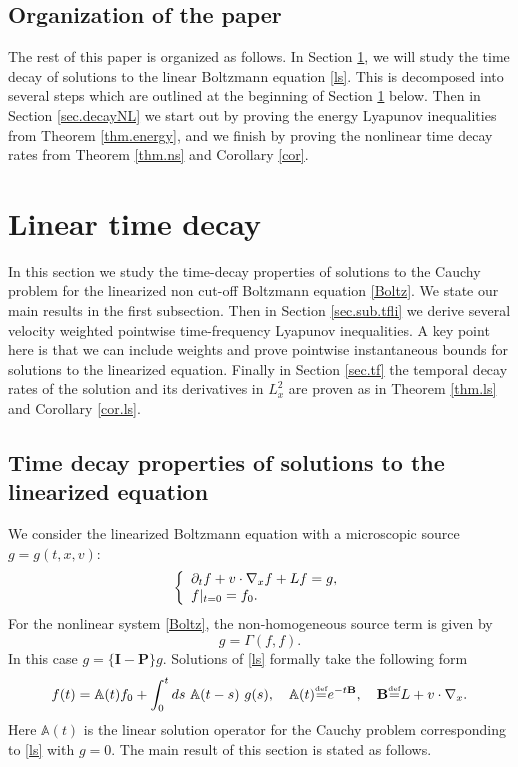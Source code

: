 \documentclass{amsart}
\numberwithin{equation}{section}
\begin{document}
\subsection{Organization of the paper}
The rest of this paper is organized as follows.  In Section \ref{sec.decayl}, we will study the time decay of solutions to the linear Boltzmann equation \eqref{ls}.  This is decomposed into several steps which are outlined at the beginning of Section \ref{sec.decayl} below.  Then in Section \ref{sec.decayNL} we start out by proving the energy Lyapunov inequalities from Theorem \ref{thm.energy}, and we finish by proving the nonlinear time decay rates from Theorem \ref{thm.ns} and Corollary \ref{cor}.

\section{Linear time decay}
\label{sec.decayl}

In this section we study the time-decay properties of solutions to the Cauchy problem for the linearized non cut-off Boltzmann equation \eqref{Boltz}.
We state our main results in the first subsection.  Then in Section \ref{sec.sub.tfli} we derive several velocity weighted pointwise time-frequency Lyapunov inequalities.  A key point here is that we can include weights and prove pointwise instantaneous bounds for solutions to the linearized equation.  
Finally in Section \ref{sec.tf} the temporal decay rates of the solution and
its derivatives in $L^2_x$ are proven as in Theorem \ref{thm.ls} and Corollary \ref{cor.ls}.

 

\subsection{Time decay properties of solutions to the linearized equation}
We consider the linearized Boltzmann equation with a
microscopic source ${g}={g}(t,x,{v})$:
\begin{equation}\label{ls}
    \left\{\begin{array}{l}
  {\displaystyle}     {\partial}_t {f}+{v}\cdot{\nabla}_x {f} +{L} {f} ={g},\\
{\displaystyle} {f}|_{t=0}={f}_0.
    \end{array}\right.
\end{equation}
For the nonlinear system \eqref{Boltz}, the non-homogeneous source term is given by
\begin{equation}\label{def.g.non}
    {g}={\Gamma}({f},{f}).
\end{equation}
In this case ${g}=\{{\mathbf{I}}-{\mathbf{P}}\} {g}$.  Solutions of \eqref{ls} formally take the following form
\begin{equation}
    {f}(t)={\mathbb{A}}(t){f}_0 + \int_0^t ds ~ {\mathbb{A}}(t-s)~{g}(s), \quad {\mathbb{A}}(t){\overset{\mbox{\tiny{def}}}{=}} e^{-t{\textbf{B}}}, \quad {\textbf{B}} {\overset{\mbox{\tiny{def}}}{=}} {L}+{v}\cdot{\nabla}_x.
    \label{ls.semi}
\end{equation}
Here ${\mathbb{A}}(t)$ is the linear solution operator for the Cauchy problem corresponding to  \eqref{ls} with ${g}=0$.
  The main result of this section is stated as follows.  
\end{document}
